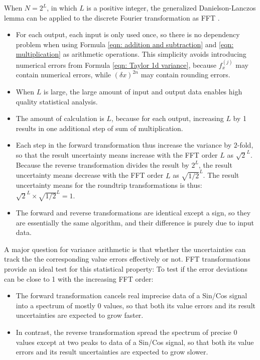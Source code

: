 \documentclass[twoside]{article}
\numberwithin{equation}{section}
\begin{document}
When $N = 2^{L}$, in which $L$ is a positive integer, the generalized Danielson-Lanczos lemma \cite{Numerical_Recipes} can be applied to the discrete Fourier transformation as FFT \cite{Numerical_Recipes}. 
\begin{itemize}

\item For each output, each input is only used once, so there is no dependency problem when using Formula \eqref{eqn: addition and subtraction} and \eqref{eqn: multiplication} as arithmetic operations.
This simplicity avoids introducing numerical errors from Formula \eqref{eqn: Taylor 1d variance}, because $f^{(j)}_x$ may contain numerical errors, while $(\delta x)^{2n}$ may contain rounding errors.

\item When $L$ is large, the large amount of input and output data enables high quality statistical analysis.

\item The amount of calculation is $L$, because for each output, increasing $L$ by 1 results in one additional step of sum of multiplication.

\item Each step in the forward transformation thus increase the variance by $2$-fold, so that the result uncertainty means increase with the FFT order $L$ as $\sqrt{2}^L$.
Because the reverse transformation divides the result by $2^L$, the result uncertainty means decrease with the FFT order $L$ as $\sqrt{1/2}^L$.
The result uncertainty means for the roundtrip transformations is thus: $\sqrt{2}^L \times \sqrt{1/2}^L = 1$.

\item The forward and reverse transformations are identical except a sign, so they are essentially the same algorithm, and their difference is purely due to input data.  

\end{itemize}

A major question for variance arithmetic is that whether the uncertainties can track the the corresponding value errors effectively or not.
FFT transformations provide an ideal test for this statistical property: To test if the error deviations can be close to 1 with the increasing FFT order:
\begin{itemize}
\item The forward transformation cancels real imprecise data of a Sin/Cos signal into a spectrum of mostly $0$ values, so that both its value errors and its result uncertainties are expected to grow faster. 

\item In contrast, the reverse transformation spread the spectrum of precise $0$ values except at two peaks to data of a Sin/Cos signal, so that both its value errors and its result uncertainties are expected to grow slower. 
\end{itemize}
\end{document}
